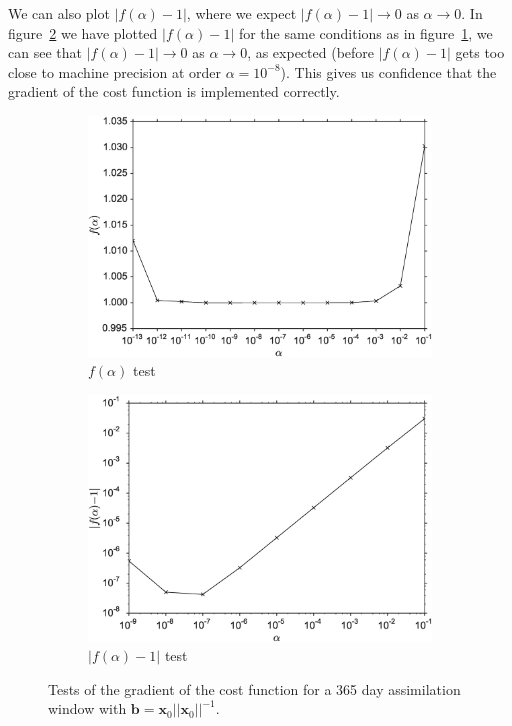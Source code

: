 \documentclass[review]{elsarticle}
\begin{document}
We can also plot $|f(\alpha)-1|$, where we expect $|f(\alpha)-1| \rightarrow 0$ as $\alpha \rightarrow 0$.  In figure~\ref{fig:cost} we have plotted $|f(\alpha)-1|$ for the same conditions as in figure~\ref{fig:costone}, we can see that $|f(\alpha) - 1| \rightarrow 0$ as $\alpha \rightarrow 0$, as expected (before $|f(\alpha)-1|$ gets too close to machine precision at order $\alpha = 10^{-8}$). This gives us confidence that the gradient of the cost function is implemented correctly.

\begin{figure}[ht]
    \centering
    \begin{subfigure}[b]{0.49\textwidth}
        \includegraphics[width=\textwidth]{costone_cvt.eps}
        \caption{$f(\alpha)$ test}
        \label{fig:costone}
    \end{subfigure}
    \begin{subfigure}[b]{0.49\textwidth}
        \includegraphics[width=\textwidth]{cost_cvt.eps}
        \caption{$|f(\alpha) - 1|$ test}
        \label{fig:cost}
    \end{subfigure}
    \caption{Tests of the gradient of the cost function for a 365 day assimilation window with $\textbf{b}=\textbf{x}_0||\textbf{x}_0||^{-1}$.}
    \label{fig:testgradcostone}
\end{figure}
\end{document}
